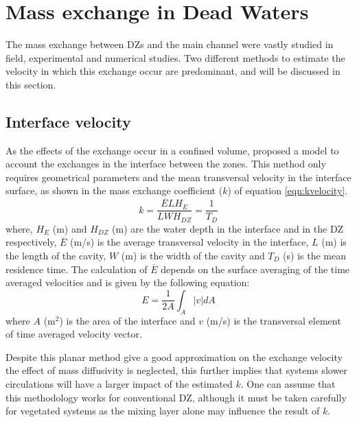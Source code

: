 \section{Mass exchange in Dead Waters}
The mass exchange between DZs and the main channel were vastly studied in field, experimental and numerical studies. Two different methods to estimate the velocity in which this exchange occur are predominant, and will be discussed in this section.

\subsection{Interface velocity}
As the effects of the exchange occur in a confined volume, \textcite{weitbrecht2001} proposed a model to account the exchanges in the interface between the zones. This method only requires geometrical parameters and the mean transversal velocity in the interface surface, as shown in the mass exchange coefficient ($k$) of equation \ref{eqn:kvelocity}.
\begin{equation}
k=\frac{\overline{E}LH_E}{L WH_{DZ}}=\frac{1}{T_D}
\label{eqn:kvelocity}
\end{equation}
where, $H_E$ (m) and $H_{DZ}$ (m) are the water depth in the interface and in the DZ respectively, $\overline{E}$ (m/s) is the average transversal velocity in the interface, $L$ (m) is the length of the cavity, $W$ (m) is the width of the cavity and $T_D$ (s) is the mean residence time. The calculation of $\overline{E}$ depends on the surface averaging of the time averaged velocities and is given by the following equation:
\begin{equation}
E = \frac{1}{2A}\int_{A}^{}\left | v \right |dA
\label{eqn:exchangeVel}
 \end{equation}
where $A$ (m$^2$) is the area of the interface and $v$ (m/s) is the transversal element of time averaged velocity vector.

Despite this planar method give a good approximation on the exchange velocity the effect of mass diffusivity is neglected, this further implies that systems slower circulations will have a larger impact of the estimated $k$. One can assume that this methodology works for conventional DZ, although it must be taken carefully for vegetated systems as the mixing layer alone may influence the result of $k$.

